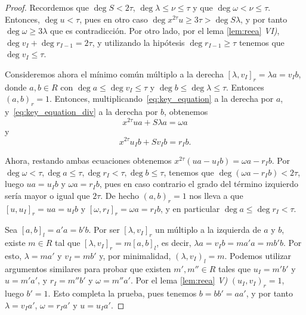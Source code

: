 \begin{proof}
    Recordemos que \(\deg S < 2\tau\), \(\deg \lambda \le \nu \le \tau\) y que \(\deg \omega < \nu \le \tau\). Entonces, \(\deg u < \tau\), pues en otro caso \(\deg x^{2\tau}u \ge 3\tau > \deg S\lambda\), y por tanto \(\deg \omega \ge 3\lambda\) que es contradicción. Por otro lado, por el lema \ref{lem:reea} \textit{VI)}, \(\deg v_{I} + \deg r_{I-1} = 2\tau\), y utilizando la hipótesis \(\deg r_{I-1} \ge \tau\) tenemos que \(\deg v_{I} \le \tau\).

    Consideremos ahora el mínimo común múltiplo a la derecha \({[\lambda, v_{I}]}_{r} = \lambda a = v_{I}b\), donde \(a, b \in R\) con \(\deg a \le \deg v_{I} \le \tau\) y \(\deg b \le \deg \lambda \le \tau\). Entonces  \({(a,b)}_{r} = 1\). Entonces, multiplicando~\eqref{eq:key_equation} a la derecha por \(a\), y~\eqref{eq:key_equation_div} a la derecha por \(b\), obtenemos
    \begin{equation}
        x^{2\tau} u a + S \lambda a = \omega a
    \end{equation}
y
    \begin{equation}
        x^{2\tau}u_{I}b + Sv_{I}b = r_{I}b.
    \end{equation}

    Ahora, restando ambas ecuaciones obtenemos \(x^{2\tau}(ua - u_{I}b) = \omega a - r_{I}b\). Por \(\deg \omega < \tau, \deg a \le \tau, \deg r_{I} < \tau, \deg{b} \le \tau\), tenemos que \(\deg (\omega a - r_{I}b) < 2\tau\), luego \(ua = u_{I}b\) y \(\omega a = r_{I}b\), pues en caso contrario el grado del término izquierdo sería mayor o igual que \(2\tau\). De hecho \({(a,b)}_{r} = 1\) nos lleva a que \({[u, u_{I}]}_r = ua = u_{I}b\) y \({[\omega, r_{I}]}_r = \omega a = r_{I}b\), y en particular \(\deg a \le \deg r_{I} < \tau\).

    Sea \({[a,b]}_l = a'a = b'b\). Por ser \([\lambda, v_{I}]_r\) un múltiplo a la izquierda de \(a\) y \(b\), existe \(m \in R\) tal que \({[\lambda, v_{I}]}_{r} = m{[a,b]}_{l}\), es decir, \(\lambda a = v_{I}b = ma'a = mb'b\). Por esto, \(\lambda = ma'\) y \(v_{I} = mb'\) y, por minimalidad, \({(\lambda, v_{I})}_l = m\). Podemos utilizar argumentos similares para probar que existen \(m', m'' \in R\) tales que \(u_{I} = m'b'\) y  \(u = m'a'\), y  \(r_{I} = m''b'\) y \(\omega = m''a'\). Por el lema \ref{lem:reea} \textit{V)} \({(u_{I}, v_{I})} _r = 1\), luego \(b' = 1\). Esto completa la prueba, pues tenemos \(b = b b' = a a'\), y por tanto  \(\lambda = v_{I}a'\), \(\omega = r_{I}a'\) y \(u = u_{I}a'\).
\end{proof}

